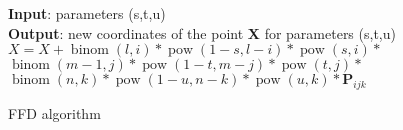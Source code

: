\begin{algorithm}
\SetAlgoNoLine
\textbf{Input}: parameters (s,t,u)\\
\textbf{Output}: new coordinates of the point \textbf{X} for parameters (s,t,u)\\
  {
    {
        {
        $X=X+\operatorname{binom}(l, i) * \operatorname{pow}(1-s, l-i) * \operatorname{pow}(s, i) *$
$\operatorname{binom}(m-1, j) * \operatorname{pow}(1-t, m-j) * \operatorname{pow}(t, j) *$
$\operatorname{binom}(n, k) * \operatorname{pow}(1-u, n-k) * \operatorname{pow}(u, k) * \boldsymbol{P}_{i j k}$
        }
    }
  }
 \caption{FFD algorithm}
 \label{ffd_algorithm}
\end{algorithm}